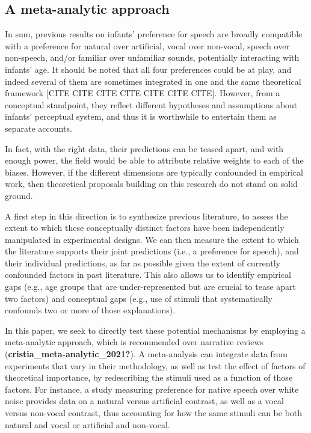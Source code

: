\documentclass[
  english,
  man]{apa6}
\begin{document}
\hypertarget{a-meta-analytic-approach}{%
\subsection{A meta-analytic approach}\label{a-meta-analytic-approach}}

In sum, previous results on infants' preference for speech are broadly compatible with a preference for natural over artificial, vocal over non-vocal, speech over non-speech, and/or familiar over unfamiliar sounds, potentially interacting with infants' age. It should be noted that all four preferences could be at play, and indeed several of them are sometimes integrated in one and the same theoretical framework {[}CITE CITE CITE CITE CITE CITE CITE{]}. However, from a conceptual standpoint, they reflect different hypotheses and assumptions about infants' perceptual system, and thus it is worthwhile to entertain them as separate accounts.

In fact, with the right data, their predictions can be teased apart, and with enough power, the field would be able to attribute relative weights to each of the biases. However, if the different dimensions are typically confounded in empirical work, then theoretical proposals building on this research do not stand on solid ground.

A first step in this direction is to synthesize previous literature, to assess the extent to which these conceptually distinct factors have been independently manipulated in experimental designs. We can then measure the extent to which the literature supports their joint predictions (i.e., a preference for speech), and their individual predictions, as far as possible given the extent of currently confounded factors in past literature. This also allows us to identify empirical gaps (e.g., age groups that are under-represented but are crucial to tease apart two factors) and conceptual gaps (e.g., use of stimuli that systematically confounds two or more of those explanations).

In this paper, we seek to directly test these potential mechanisms by employing a meta-analytic approach, which is recommended over narrative reviews (\textbf{cristia\_meta-analytic\_2021?}). A meta-analysis can integrate data from experiments that vary in their methodology, as well as test the effect of factors of theoretical importance, by redescribing the stimuli used as a function of those factors. For instance, a study measuring preference for native speech over white noise provides data on a natural versus artificial contrast, as well as a vocal versus non-vocal contrast, thus accounting for how the same stimuli can be both natural and vocal or artificial and non-vocal.
\end{document}
